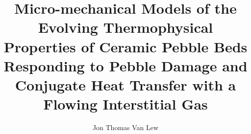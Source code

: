 \documentclass [prospectus] {uclathes}
\title          {Micro-mechanical Models of the Evolving Thermophysical Properties of Ceramic Pebble Beds Responding to Pebble Damage and Conjugate Heat Transfer with a Flowing Interstitial Gas}
\author         {Jon Thomas Van Lew}
\begin{document}
\makeintropages














\end{document}
